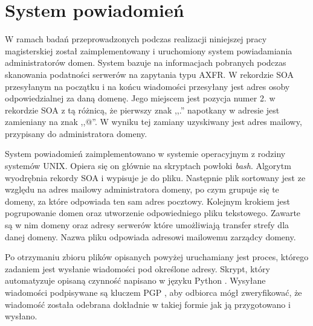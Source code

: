 \section{System powiadomień}
W ramach badań przeprowadzonych podczas realizacji niniejszej pracy magisterskiej został zaimplementowany i uruchomiony system
powiadamiania administratorów domen. System bazuje na informacjach pobranych podczas skanowania podatności serwerów na zapytania
typu AXFR. W rekordzie SOA przesyłanym na początku i na końcu wiadomości przesyłany jest adres osoby odpowiedzialnej za daną domenę.
Jego miejscem jest pozycja numer 2. w rekordzie SOA z tą różnicą, że pierwszy znak ,,.'' napotkany w adresie jest zamieniany na
znak ,,@''. W wyniku tej zamiany uzyskiwany jest adres mailowy, przypisany do administratora domeny.

System powiadomień zaimplementowano w systemie operacyjnym z rodziny systemów UNIX. Opiera się on głównie na skryptach powłoki
\textit{bash}. Algorytm wyodrębnia rekordy SOA i wypisuje je do pliku. Następnie plik sortowany jest ze względu na adres mailowy
administratora domeny, po czym grupuje się te domeny, za które odpowiada ten sam adres pocztowy. Kolejnym krokiem jest pogrupowanie
domen oraz utworzenie odpowiedniego pliku tekstowego. Zawarte są w nim domeny oraz adresy serwerów które umożliwiają transfer
strefy dla danej domeny. Nazwa pliku odpowiada adresowi mailowemu zarządcy domeny.

Po otrzymaniu zbioru plików opisanych powyżej uruchamiany jest proces, którego zadaniem jest wysłanie wiadomości pod określone
adresy. Skrypt, który automatyzuje opisaną czynność napisano w języku Python \cite{python}. Wysyłane wiadomości podpisywane są
kluczem PGP \cite{RFC4880}, aby odbiorca mógł zweryfikować, że wiadomość została odebrana dokładnie w takiej formie jak ją przygotowano
i wysłano.
